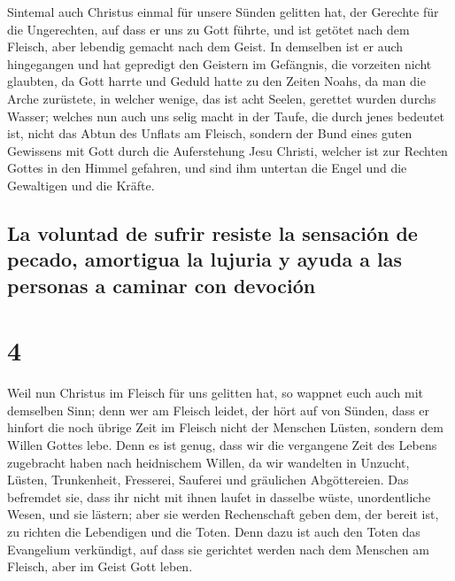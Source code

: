  Sintemal auch Christus einmal für unsere Sünden gelitten
hat, der Gerechte für die Ungerechten, auf dass er uns zu Gott führte,
und ist getötet nach dem Fleisch, aber lebendig gemacht nach dem Geist.
 In demselben ist er auch hingegangen und hat gepredigt
den Geistern im Gefängnis,  die vorzeiten nicht glaubten,
da Gott harrte und Geduld hatte zu den Zeiten Noahs, da man die Arche
zurüstete, in welcher wenige, das ist acht Seelen, gerettet wurden
durchs Wasser;  welches nun auch uns selig macht in der
Taufe, die durch jenes bedeutet ist, nicht das Abtun des Unflats am
Fleisch, sondern der Bund eines guten Gewissens mit Gott durch die
Auferstehung Jesu Christi,  welcher ist zur Rechten
Gottes in den Himmel gefahren, und sind ihm untertan die Engel und die
Gewaltigen und die Kräfte.

\hypertarget{la-voluntad-de-sufrir-resiste-la-sensaciuxf3n-de-pecado-amortigua-la-lujuria-y-ayuda-a-las-personas-a-caminar-con-devociuxf3n}{%
\subsection{La voluntad de sufrir resiste la sensación de pecado,
amortigua la lujuria y ayuda a las personas a caminar con
devoción}\label{la-voluntad-de-sufrir-resiste-la-sensaciuxf3n-de-pecado-amortigua-la-lujuria-y-ayuda-a-las-personas-a-caminar-con-devociuxf3n}}

\hypertarget{section-3}{%
\section{4}\label{section-3}}

 Weil nun Christus im Fleisch für uns gelitten hat, so
wappnet euch auch mit demselben Sinn; denn wer am Fleisch leidet, der
hört auf von Sünden,  dass er hinfort die noch übrige Zeit
im Fleisch nicht der Menschen Lüsten, sondern dem Willen Gottes lebe.
 Denn es ist genug, dass wir die vergangene Zeit des
Lebens zugebracht haben nach heidnischem Willen, da wir wandelten in
Unzucht, Lüsten, Trunkenheit, Fresserei, Sauferei und gräulichen
Abgöttereien.  Das befremdet sie, dass ihr nicht mit ihnen
laufet in dasselbe wüste, unordentliche Wesen, und sie lästern;
 aber sie werden Rechenschaft geben dem, der bereit ist,
zu richten die Lebendigen und die Toten.  Denn dazu ist
auch den Toten das Evangelium verkündigt, auf dass sie gerichtet werden
nach dem Menschen am Fleisch, aber im Geist Gott leben.


